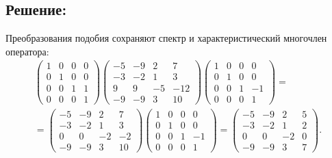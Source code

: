 \documentclass[12pt]{article}
\begin{document}
    \subsection*{Решение:}
    Преобразования подобия сохраняют спектр и характеристический многочлен оператора:
    \begin{multline*}
        \begin{pmatrix}
            1 & 0 & 0 & 0 \\
            0 & 1 & 0 & 0 \\
            0 & 0 & 1 & 1 \\
            0 & 0 & 0 & 1
        \end{pmatrix}
        \begin{pmatrix}
            -5 & -9 & 2 & 7 \\
            -3 & -2 & 1 & 3 \\
            9 & 9 & -5 & -12 \\
            -9 & -9 & 3 & 10
        \end{pmatrix}
        \begin{pmatrix}
            1 & 0 & 0 & 0 \\
            0 & 1 & 0 & 0 \\
            0 & 0 & 1 & -1 \\
            0 & 0 & 0 & 1
        \end{pmatrix} = \\
        =
        \begin{pmatrix}
            -5 & -9 & 2 & 7 \\
            -3 & -2 & 1 & 3 \\
            0 & 0 & -2 & -2 \\
            -9 & -9 & 3 & 10
        \end{pmatrix}
        \begin{pmatrix}
            1 & 0 & 0 & 0 \\
            0 & 1 & 0 & 0 \\
            0 & 0 & 1 & -1 \\
            0 & 0 & 0 & 1
        \end{pmatrix}
        =
        \begin{pmatrix}
            -5 & -9 & 2 & 5 \\
            -3 & -2 & 1 & 2 \\
            0 & 0 & -2 & 0 \\
            -9 & -9 & 3 & 7
        \end{pmatrix}.
    \end{multline*}
\end{document}
